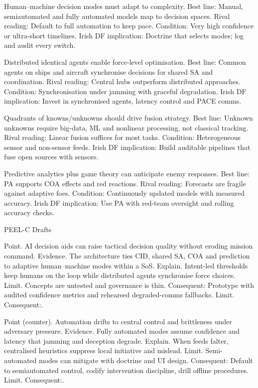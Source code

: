 Human–machine decision modes must adapt to complexity.
Best line: Manual, semiautomated and fully automated models map to decision spaces.
Rival reading: Default to full automation to keep pace.
Condition: Very high confidence or ultra-short timelines.
Irish DF implication: Doctrine that selects modes; log and audit every switch.

Distributed identical agents enable force-level optimisation.
Best line: Common agents on ships and aircraft synchronise decisions for shared SA and coordination.
Rival reading: Central hubs outperform distributed approaches.
Condition: Synchronisation under jamming with graceful degradation.
Irish DF implication: Invest in synchronised agents, latency control and PACE comms.

Quadrants of knowns/unknowns should drive fusion strategy.
Best line: Unknown unknowns require big-data, ML and nonlinear processing, not classical tracking.
Rival reading: Linear fusion suffices for most tasks.
Condition: Heterogeneous sensor and non-sensor feeds.
Irish DF implication: Build auditable pipelines that fuse open sources with sensors.

Predictive analytics plus game theory can anticipate enemy responses.
Best line: PA supports COA effects and red reactions.
Rival reading: Forecasts are fragile against adaptive foes.
Condition: Continuously updated models with measured accuracy.
Irish DF implication: Use PA with red-team oversight and rolling accuracy checks.

PEEL-C Drafts

Point. AI decision aids can raise tactical decision quality without eroding mission command.
Evidence. The architecture ties CID, shared SA, COA and prediction to adaptive human–machine modes within a SoS.
Explain. Intent-led thresholds keep humans on the loop while distributed agents synchronise force choices.
Limit. Concepts are untested and governance is thin. Consequent: Prototype with audited confidence metrics and rehearsed degraded-comms fallbacks. Limit. Consequent:.

Point (counter). Automation drifts to central control and brittleness under adversary pressure.
Evidence. Fully automated modes assume confidence and latency that jamming and deception degrade.
Explain. When feeds falter, centralised heuristics suppress local initiative and mislead.
Limit. Semi-automated modes can mitigate with doctrine and UI design. Consequent: Default to semiautomated control, codify intervention discipline, drill offline procedures. Limit. Consequent:.


